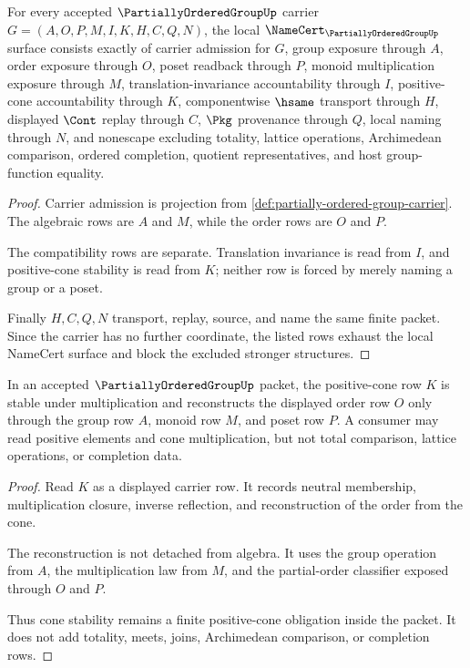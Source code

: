 \begin{theorem}
\label{thm:partially-ordered-group-namecert-obligations}
For every accepted $\PartiallyOrderedGroupUp$ carrier $G=(A,O,P,M,I,K,H,C,Q,N)$, the local $\NameCert_{\PartiallyOrderedGroupUp}$ surface consists exactly of carrier admission for $G$, group exposure through $A$, order exposure through $O$, poset readback through $P$, monoid multiplication exposure through $M$, translation-invariance accountability through $I$, positive-cone accountability through $K$, componentwise $\hsame$ transport through $H$, displayed $\Cont$ replay through $C$, $\Pkg$ provenance through $Q$, local naming through $N$, and nonescape excluding totality, lattice operations, Archimedean comparison, ordered completion, quotient representatives, and host group-function equality.
\end{theorem}
\begin{proof}
Carrier admission is projection from \autoref{def:partially-ordered-group-carrier}. The algebraic rows are $A$ and $M$, while the order rows are $O$ and $P$.

The compatibility rows are separate. Translation invariance is read from $I$, and positive-cone stability is read from $K$; neither row is forced by merely naming a group or a poset.

Finally $H,C,Q,N$ transport, replay, source, and name the same finite packet. Since the carrier has no further coordinate, the listed rows exhaust the local NameCert surface and block the excluded stronger structures.
\end{proof}

\begin{theorem}
\label{thm:partially-ordered-group-positive-cone-stability}
In an accepted $\PartiallyOrderedGroupUp$ packet, the positive-cone row $K$ is stable under multiplication and reconstructs the displayed order row $O$ only through the group row $A$, monoid row $M$, and poset row $P$. A consumer may read positive elements and cone multiplication, but not total comparison, lattice operations, or completion data.
\end{theorem}
\begin{proof}
Read $K$ as a displayed carrier row. It records neutral membership, multiplication closure, inverse reflection, and reconstruction of the order from the cone.

The reconstruction is not detached from algebra. It uses the group operation from $A$, the multiplication law from $M$, and the partial-order classifier exposed through $O$ and $P$.

Thus cone stability remains a finite positive-cone obligation inside the packet. It does not add totality, meets, joins, Archimedean comparison, or completion rows.
\end{proof}

